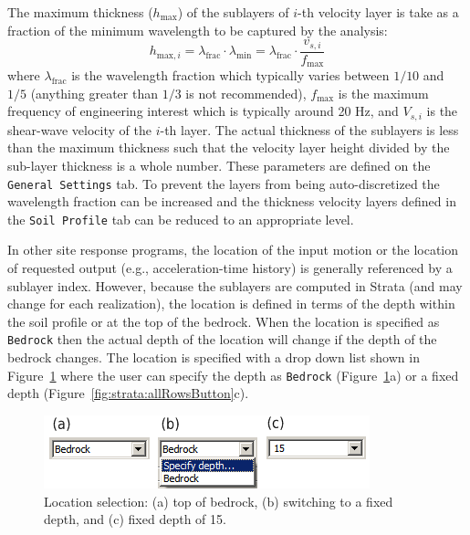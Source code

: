 \documentclass[11pt]{report}
\begin{document}
The maximum thickness ($h_\text{max}$) of the sublayers of $i$-th velocity layer is take as a
fraction of the minimum wavelength to be captured by the analysis:
\begin{equation}
	h_{\text{max},i} = \lambda_\text{frac} \cdot \lambda_\text{min} = \lambda_\text{frac} \cdot
	\frac{v_{s,i}}{f_\text{max}}
\end{equation}
where $\lambda_{\text{frac}}$ is the wavelength fraction which typically varies between $1/10$ and
$1/5$ (anything greater than $1/3$ is not recommended), $f_{\text{max}}$ is the maximum frequency of
engineering interest which is typically around 20 Hz, and $V_{s,i}$ is the shear-wave velocity of
the $i$-th layer.  The actual thickness of the sublayers is less than the maximum thickness such
that the velocity layer height divided by the sub-layer thickness is a whole number.  These
parameters are defined on the \texttt{General Settings} tab.  To prevent the layers from being
auto-discretized the wavelength fraction can be increased and the thickness velocity layers defined
in the \texttt{Soil Profile} tab can be reduced to an appropriate level.

In other site response programs, the location of the input motion or the location of
requested output (e.g., acceleration-time history) is generally referenced by a sublayer index.
However, because the sublayers are computed in Strata (and may change for
each realization), the location is defined in terms of the depth within the soil profile
or at the top of the bedrock.  When the location is specified as \texttt{Bedrock} then the actual depth
of the location will change if the depth of the bedrock changes.  The location is specified with a
drop down list shown in Figure~\ref{fig:strata:locationSlection} where the user can specify the
depth as \texttt{Bedrock} (Figure~\ref{fig:strata:locationSlection}a) or a fixed depth
(Figure~\ref{fig:strata:allRowsButton}c).

\begin{figure}[htb]
  \begin{center}
	\includegraphics[scale=0.65]{figures/strata/locationSelection.png}
  \end{center}
  \caption[Strata location selection]{Location selection: (a) top of bedrock, (b) switching to a
  fixed depth, and (c) fixed depth of 15.}
  \label{fig:strata:locationSlection}
\end{figure}
\end{document}
